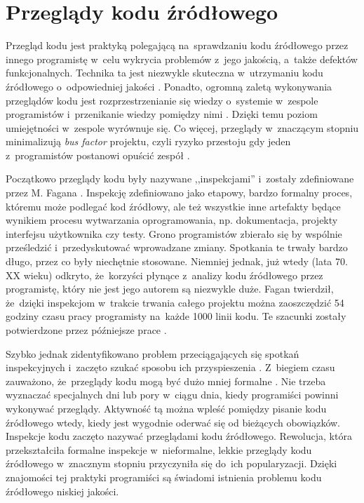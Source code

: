 \documentclass[twoside]{praca}
\begin{document}
\section{Przeglądy kodu źródłowego}
\label{sec:related:cr}

Przegląd kodu jest praktyką polegającą na~sprawdzaniu kodu źródłowego przez innego programistę w~celu wykrycia problemów z~jego jakością, a~także defektów funkcjonalnych. Technika ta jest niezwykle skuteczna w~utrzymaniu kodu źródłowego o~odpowiedniej jakości \cite{beller2014modern, nelson2004makes, mcintosh2016empirical, fatima2018challenges}. Ponadto, ogromną zaletą wykonywania przeglądów kodu jest rozprzestrzenianie się wiedzy o~systemie w~zespole programistów i~przenikanie wiedzy pomiędzy nimi \cite{9reasons}. Dzięki temu poziom umiejętności w~zespole wyrównuje się. Co więcej, przeglądy w~znaczącym stopniu minimalizują \textit{bus factor} projektu, czyli ryzyko przestoju gdy jeden z~programistów postanowi opuścić zespół \cite{cosentino2015assessing}.

Początkowo przeglądy kodu były nazywane ,,inspekcjami'' i~zostały zdefiniowane przez M. Fagana \cite{Fagan1976, fagan2002design}. Inspekcję zdefiniowano jako etapowy, bardzo formalny proces, któremu może podlegać kod źródłowy, ale też wszystkie inne artefakty będące wynikiem procesu wytwarzania oprogramowania, np. dokumentacja, projekty interfejsu użytkownika czy testy. Grono programistów zbierało się by wspólnie prześledzić i~przedyskutować wprowadzane zmiany. Spotkania te trwały bardzo długo, przez co były niechętnie stosowane. Niemniej jednak, już wtedy (lata 70. XX wieku) odkryto, że~korzyści płynące z~analizy kodu źródłowego przez programistę, który nie jest jego autorem są niezwykle duże. Fagan twierdził, że~dzięki inspekcjom w~trakcie trwania całego projektu można zaoszczędzić 54 godziny czasu pracy programisty na~każde 1000 linii kodu. Te szacunki zostały potwierdzone przez późniejsze prace \cite{radice2001high, cohen2006best}.

Szybko jednak zidentyfikowano problem przeciągających się spotkań inspekcyjnych i~zaczęto szukać sposobu ich przyspieszenia \cite{freimut2005determining}. Z~biegiem czasu zauważono, że~przeglądy kodu mogą być dużo mniej formalne \cite{beller2014modern, bacchelli2013expectations}. Nie trzeba wyznaczać specjalnych dni lub pory w~ciągu dnia, kiedy programiści powinni wykonywać przeglądy. Aktywność tą można wpleść pomiędzy pisanie kodu źródłowego wtedy, kiedy jest wygodnie oderwać się od bieżących obowiązków. Inspekcje kodu zaczęto nazywać przeglądami kodu źródłowego. Rewolucja, która przekształciła formalne inspekcje w~nieformalne, lekkie przeglądy kodu źródłowego w~znacznym stopniu przyczyniła się do~ich popularyzacji. Dzięki znajomości tej praktyki programiści są świadomi istnienia problemu kodu źródłowego niskiej jakości. 
\end{document}
